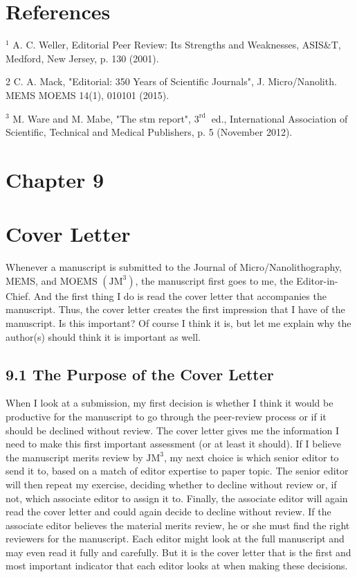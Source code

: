 \section*{References}
${ }^{1}$ A. C. Weller, Editorial Peer Review: Its Strengths and Weaknesses, ASIS\&T, Medford, New Jersey, p. 130 (2001).

2 C. A. Mack, "Editorial: 350 Years of Scientific Journals", J. Micro/Nanolith. MEMS MOEMS 14(1), 010101 (2015).

${ }^{3}$ M. Ware and M. Mabe, "The stm report", $3^{\text{rd }}$ ed., International Association of Scientific, Technical and Medical Publishers, p. 5 (November 2012).

\section*{Chapter 9}
\section*{Cover Letter}
Whenever a manuscript is submitted to the Journal of Micro/Nanolithography, MEMS, and MOEMS $\left(\mathrm{JM}^{3}\right)$, the manuscript first goes to me, the Editor-in-Chief. And the first thing I do is read the cover letter that accompanies the manuscript. Thus, the cover letter creates the first impression that I have of the manuscript. Is this important? Of course I think it is, but let me explain why the author(s) should think it is important as well.

\subsection*{9.1 The Purpose of the Cover Letter}
When I look at a submission, my first decision is whether I think it would be productive for the manuscript to go through the peer-review process or if it should be declined without review. The cover letter gives me the information I need to make this first important assessment (or at least it should). If I believe the manuscript merits review by $\mathrm{JM}^{3}$, my next choice is which senior editor to send it to, based on a match of editor expertise to paper topic. The senior editor will then repeat my exercise, deciding whether to decline without review or, if not, which associate editor to assign it to. Finally, the associate editor will again read the cover letter and could again decide to decline without review. If the associate editor believes the material merits review, he or she must find the right reviewers for the manuscript. Each editor might look at the full manuscript and may even read it fully and carefully. But it is the cover letter that is the first and most important indicator that each editor looks at when making these decisions.

